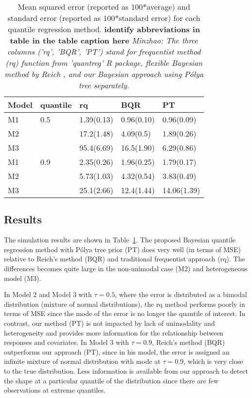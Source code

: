 \documentclass[12pt]{article}
\newcommand{\polya}{P\'{o}lya}
\begin{document}
\begin{center}
  \begin{table}[h]
    \centering
    \caption[]{ Mean squared error (reported as 100*average) and standard
      error (reported as 100*standard error) for each
      quantile regression method.  {\bf identify abbreviations in
        table in the table caption here} {\it Minzhao: The three
        columns ('rq', 'BQR',
        'PT') stand for frequentist method (rq) function from
        'quantreg' R package, flexible Bayesian method by Reich , and
        our Bayesian approach using \polya{} tree separately.}}
    \vspace{4mm}
    \begin{tabular}[tb]{l|l|lll}
      \hline
      Model & quantile & rq         & BQR        & PT          \\
      \hline
      M1    & 0.5      & 1.39(0.13) & 0.96(0.10) & 0.96(0.09)  \\
      M2    &          & 17.2(1.48) & 4.09(0.5)  & 1.89(0.26)  \\
      M3    &          & 95.4(6.69) & 16.5(1.90) & 6.29(0.86)  \\
      \hline
      M1    & 0.9      & 2.35(0.26) & 1.96(0.25) & 1.79(0.17)  \\
      M2    &          & 5.73(1.03) & 4.32(0.54) & 3.83(0.49)  \\
      M3    &          & 25.1(2.66) & 12.4(1.44) & 14.06(1.39) \\
      \hline
    \end{tabular}
    \label{tab:1}
  \end{table}
\end{center}

\subsection{Results}
The simulation results are shown in Table~\ref{tab:1}. The proposed
Bayesian quantile regression method with \polya{} tree prior (PT)
does very well (in terms of MSE) relative to Reich's method (BQR)
and traditional frequentist approach 
(rq).
The differences becomes quite large in
the  non-unimodal case (M2) and heterogeneous model (M3). 

In Model 2 and Model 3 with $\tau=0.5$, where the error is
distributed as a bimodal distribution (mixture of normal
distributions), the rq method performs poorly in terms of MSE
since the mode of the error is no longer the quantile of
interest. In contrast, our method (PT) is not impacted by lack of
unimodality and heterogeneity and provides more information
for the relationship between responses and covariates. In Model 3
with $\tau=0.9$, Reich's method (BQR) outperforms our approach (PT),
since in his model, the error is assigned an infinite mixture of
normal distribution with mode at $\tau=0.9$, which is very close to
the true distribution. Less information is available from our
approach to detect the shape at a particular quantile of the
distribution since there are few observations at extreme quantiles. 
\end{document}
